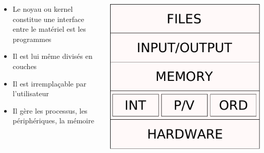 \begin{frame}{\sectitle}

\begin{columns}[b]

\begin{block}{\subsectitle}
\begin{itemize}
\item Le noyau ou kernel constitue une interface entre le matériel est les programmes
\item Il est lui même divisés en couches 
\item Il est irremplaçable par l'utilisateur
\item Il gère les processus, les périphériques, la mémoire
\end{itemize}
\end{block}

\begin{center}
\includegraphics[width=\textwidth]{images/NoyauCouches.pdf}
\end{center}

\end{columns}
\end{frame}



